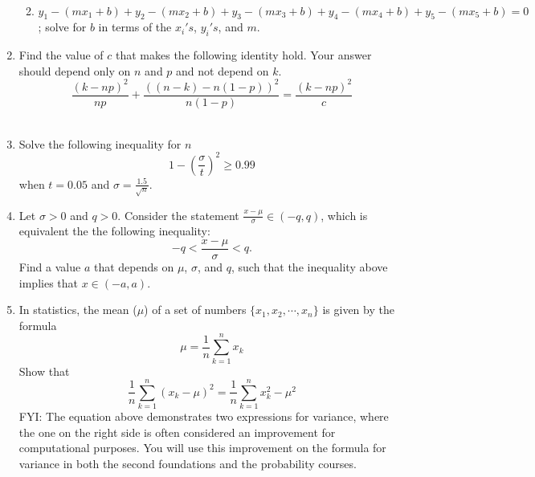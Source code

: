 \documentclass{article}
\begin{document}
\begin{enumerate}
\begin{enumerate}
                            \\[$\frac{e^{a+bx}}{e^{a+b(x+1)}}$]
                            \item $ y_1-(mx_1+b)+y_2-(mx_2+b)+y_3-(mx_3+b)+y_4-(mx_4+b)+y_5-(mx_5+b)=0$; solve for $b$ in terms of the $x_i's$, $y_i's$, and $m$.
                            \\[$b=\sum_{n=1}^{5}\frac{m(x_n)-y_n}{5}$]
                        \end{enumerate}
                    \item Find the value of $c$ that makes the following identity hold. Your answer should depend only on $n$ and $p$ and not depend on $k$. \[\frac{(k-np)^2}{np}+\frac{((n-k)-n(1-p))^2}{n(1-p)}=\frac{(k-np)^2}{c}\]
                    \\[$c=np-np^{2}$]
                    \item Solve the following inequality for $n$ $$1-\left(\frac{\sigma}{t}\right)^2 \geq 0.99$$ when $t=0.05$ and $ \sigma = \frac{1.5}{\sqrt{n}}$.
                    \\[$n\leq90000$]
                    \item Let $\sigma >0$ and $q >0$.  Consider the statement $ \frac{x-\mu}{\sigma} \in (-q, q)$, which is equivalent the the following inequality: $$-q < \frac{x-\mu}{\sigma} <q.$$  Find a value $a$ that depends on $\mu$, $\sigma$, and $q$, such that the inequality above implies that $x\in(-a,a)$. 
                    \\[$-|\mu-q\sigma|<x<|\mu+q\sigma|$]
                    \item In statistics, the mean ($\mu$) of a set of numbers $\{x_1, x_2, \cdots, x_n\}$ is given by the formula $$\mu = \frac{1}{n}\sum_{k=1}^n x_k$$  Show that $$\frac{1}{n}\sum_{k=1}^n (x_k-\mu)^2 = \frac{1}{n}\sum_{k=1}^n x_k^2-\mu^2$$  FYI: The equation above demonstrates two expressions for variance, where the one on the right side is often considered an improvement for computational purposes.  You will use this improvement on the formula for variance in both the second foundations and the probability courses.
                    \\[$\frac{1}{n}\sum_{k=1}^{n}(x_k-\mu)^{2}$]
                    \\[$\frac{1}{n}\sum_{k=1}^{n}(x_k^{2}-2x_{k}\mu+\mu^{2})$]
                    \\[$\frac{1}{n}(\sum_{k=1}^{n}x_k^{2}-2\mu\sum_{k=1}^{n}x_k+\sum_{k=1}^{n}\mu^{2})$]
                    \\[$\frac{1}{n}(\sum_{k=1}^{n}x_k^{2}-2\mu(n\mu)+\sum_{k=1}^{n}n\mu^{2})$]

\end{enumerate}
\end{document}

